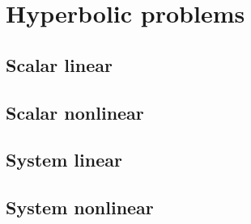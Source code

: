 \documentclass[letterpaper,10pt,english]{jupyterBook}
\begin{document}
\sphinxstepscope


\chapter{Hyperbolic problems}
\label{\detokenize{ch/pde/hyperbolic:hyperbolic-problems}}\label{\detokenize{ch/pde/hyperbolic:pde-hyperbolic}}\label{\detokenize{ch/pde/hyperbolic::doc}}

\section{Scalar linear}
\label{\detokenize{ch/pde/hyperbolic:scalar-linear}}\label{\detokenize{ch/pde/hyperbolic:pde-hyperbolic-scalar-linear}}

\section{Scalar non\sphinxhyphen{}linear}
\label{\detokenize{ch/pde/hyperbolic:scalar-non-linear}}\label{\detokenize{ch/pde/hyperbolic:pde-hyperbolic-scalar-non-linear}}

\section{System linear}
\label{\detokenize{ch/pde/hyperbolic:system-linear}}\label{\detokenize{ch/pde/hyperbolic:pde-hyperbolic-system-linear}}

\section{System non\sphinxhyphen{}linear}
\label{\detokenize{ch/pde/hyperbolic:system-non-linear}}\label{\detokenize{ch/pde/hyperbolic:pde-hyperbolic-system-non-linear}}
\sphinxstepscope
\end{document}
